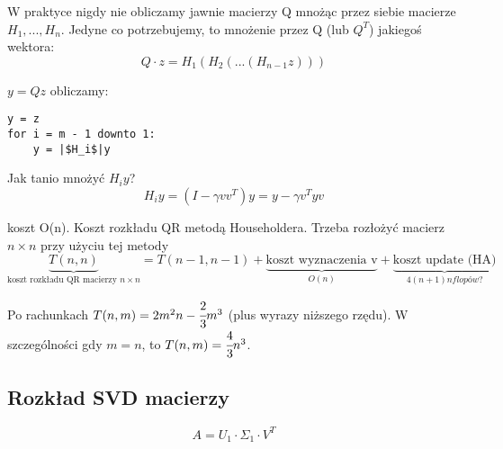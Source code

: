 \documentclass[hidelinks,a4paper,fleqn,oneside]{book}
\newcommand{\RR}{\mathbb{R}}
\newcommand{\ra}{\rightarrow}
\newcommand{\norm}[1]{\left\lVert#1\right\rVert}
\begin{document}
W praktyce nigdy nie obliczamy jawnie macierzy Q mnożąc przez siebie macierze $H_1, ..., H_n$. Jedyne co potrzebujemy, to mnożenie przez Q (lub $Q^T$) jakiegoś wektora:
\[
	Q \cdot z = H_1(H_2(...(H_{n-1}z)))
\]

$y = Qz$ obliczamy:
\begin{verbatim}
y = z
for i = m - 1 downto 1:
    y = |$H_i$|y
\end{verbatim}

Jak tanio mnożyć $H_i y$?
\[
	H_i y = (I - \gamma vv^T)y = y - \gamma v^Tyv
\]

koszt O(n).
Koszt rozkładu QR metodą Householdera. Trzeba rozłożyć macierz $n \times n$ przy użyciu tej metody
\[
	\underbrace{T(n, n)}_{\textrm{koszt rozkładu QR macierzy }n \times n} = T(n-1, n-1) + \underbrace{\textrm{koszt wyznaczenia v}}_{O(n)} + \underbrace{\textrm{koszt update (HA)}}_{4(n+1)n flopów?}
\]

Po rachunkach $T(n, m) = 2m^2n - \cfrac{2}{3}m^3$ (plus wyrazy niższego rzędu). W szczególności gdy $m = n$, to $T(n, m) = \cfrac{4}{3} n^3$.

\subsection{Rozkład SVD macierzy} 
%
%


\[
	A = U_1 \cdot \Sigma_1 \cdot V^T 
\]
\end{document}
